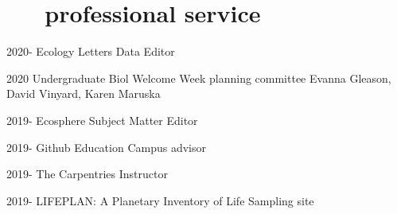 \documentclass[]{CV}
\begin{document}












\section{ \faUserPlus \ \ \ professional service}

\begin{entrylist}

 \entry
	 {2020-}
	 {Ecology Letters}
	 {Data Editor}

 \entry
	 {2020}
	 {Undergraduate Biol Welcome Week planning committee}
	 {Evanna Gleason, David Vinyard, Karen Maruska}
	 
 \entry
	 {2019-}
	 {Ecosphere}
	 {Subject Matter Editor}

 \entry
	 {2019-}
	 {Github Education}
	 {Campus advisor}

 \entry
	 {2019-}
	 {The Carpentries}
	 {Instructor}

 \entry
	 {2019-}
	 {LIFEPLAN: A Plan­et­ary In­vent­ory of Life}
	 {Sampling site}

\end{entrylist}
\end{document}
